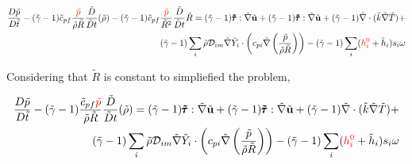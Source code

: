 \documentclass[preprint,12pt,authoryear]{elsarticle}
\begin{document}
\begin{equation}
\begin{split}
        \frac{D \tilde{p}}{D\tilde{t}}
	-
	(\tilde{\gamma}-1)
        \tilde{c}_{pf}
	\frac{ {\color{red} \tilde{p} } }{\tilde{\rho}\tilde{R}}
        \frac{\tilde{D}}{\tilde{D} t}
	(
	\tilde{\rho}
	)
	-
	(\tilde{\gamma}-1)
        \tilde{c}_{pf}
	\frac{ {\color{red} \tilde{p} } }{\tilde{R}^2}
        \frac{\tilde{D}}{\tilde{D} t}
	\tilde{R}
        =
	(\tilde{\gamma}-1)
        \pmb{\tilde{\tau}}:\tilde{\nabla} \tilde{\mathbf{u}} 
        + 
	(\tilde{\gamma}-1)
        \pmb{\tilde{\tau}}:\tilde{\nabla} \tilde{\mathbf{u}} 
        + 
	(\tilde{\gamma}-1)
        \tilde{\nabla} \cdot (\tilde{k}\tilde{\nabla} \tilde{T})
        +
	\\
	(\tilde{\gamma}-1)
        \sum\limits_i 
        \tilde{\rho}
        \mathcal{D}_{im}
        \tilde{\nabla}
        \tilde{Y}_i     
        \cdot
        \left(
                c_{pi}
                \tilde{\nabla}
                \left(
                	\frac{\tilde{p}}{\tilde{\rho}\tilde{R}}
                \right)
        \right)
	-
	(\tilde{\gamma}-1)
        \sum\limits_i
        ({\color{red} h_i^0} + \tilde{h}_i)
        s_i	
        \omega
\end{split}
\end{equation}


Considering that $\tilde{R}$ is constant to simpliefied the problem,

\begin{equation}
\begin{split}
        \frac{D \tilde{p}}{D\tilde{t}}
	-
	(\tilde{\gamma}-1)
	\frac{\tilde{c}_{pf} {\color{red} \tilde{p} }  }{\tilde{\rho}\tilde{R}}
        \frac{\tilde{D}}{\tilde{D} t}
	(
	\tilde{\rho}
	)
        =
	(\tilde{\gamma}-1)
        \pmb{\tilde{\tau}}:\tilde{\nabla} \tilde{\mathbf{u}} 
        + 
	(\tilde{\gamma}-1)
        \pmb{\tilde{\tau}}:\tilde{\nabla} \tilde{\mathbf{u}} 
        + 
	(\tilde{\gamma}-1)
        \tilde{\nabla} \cdot (\tilde{k}\tilde{\nabla} \tilde{T})
        +
	\\
	(\tilde{\gamma}-1)
        \sum\limits_i 
        \tilde{\rho}
        \mathcal{D}_{im}
        \tilde{\nabla}
        \tilde{Y}_i     
        \cdot
        \left(
                c_{pi}
                \tilde{\nabla}
                \left(
                	\frac{\tilde{p}}{\tilde{\rho}\tilde{R}}
                \right)
        \right)
	-
	(\tilde{\gamma}-1)
        \sum\limits_i
        ({\color{red} h_i^0} + \tilde{h}_i)
        s_i	
        \omega
\end{split}
\end{equation}
\end{document}
